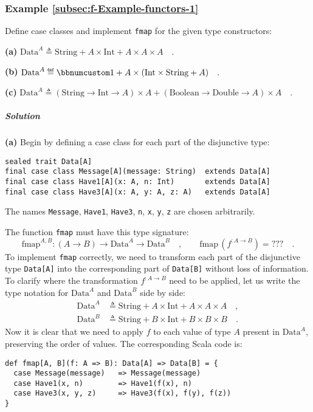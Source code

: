 \subsubsection{Example \label{subsec:f-Example-functors-1}\ref{subsec:f-Example-functors-1}}

Define case classes and implement \lstinline!fmap! for the given
type constructors:

\textbf{(a)} $\text{Data}^{A}\triangleq\text{String}+A\times\text{Int}+A\times A\times A\quad.$

\textbf{(b)} $\text{Data}^{A}\triangleq\bbnum 1+A\times(\text{Int}\times\text{String}+A)\quad.$

\textbf{(c)} $\text{Data}^{A}\triangleq(\text{String}\rightarrow\text{Int}\rightarrow A)\times A+(\text{Boolean}\rightarrow\text{Double}\rightarrow A)\times A\quad.$

\subparagraph{Solution}

\textbf{(a)} Begin by defining a case class for each part of the disjunctive
type:
\begin{lstlisting}
sealed trait Data[A] 
final case class Message[A](message: String)  extends Data[A]
final case class Have1[A](x: A, n: Int)       extends Data[A]  
final case class Have3[A](x: A, y: A, z: A)   extends Data[A]
\end{lstlisting}
The names \lstinline!Message!, \lstinline!Have1!, \lstinline!Have3!,
\lstinline!n!, \lstinline!x!, \lstinline!y!, \lstinline!z! are
chosen arbitrarily. 

The function \lstinline!fmap! must have this type signature:
\[
\text{fmap}^{A,B}:\left(A\rightarrow B\right)\rightarrow\text{Data}^{A}\rightarrow\text{Data}^{B}\quad,\quad\quad\text{fmap}\,(f^{:A\rightarrow B})=\text{???}\quad.
\]
To implement \lstinline!fmap! correctly, we need to transform each
part of the disjunctive type \lstinline!Data[A]! into the corresponding
part of \lstinline!Data[B]! without loss of information. To clarify
where the transformation $f^{:A\rightarrow B}$ need to be applied,
let us write the type notation for $\text{Data}^{A}$ and $\text{Data}^{B}$
side by side:
\begin{align*}
\text{Data}^{A} & \triangleq\text{String}+A\times\text{Int}+A\times A\times A\quad,\\
\text{Data}^{B} & \triangleq\text{String}+B\times\text{Int}+B\times B\times B\quad.
\end{align*}
Now it is clear that we need to apply $f$ to each value of type $A$
present in $\text{Data}^{A}$, preserving the order of values. The
corresponding Scala code is:
\begin{lstlisting}
def fmap[A, B](f: A => B): Data[A] => Data[B] = {
  case Message(message)   => Message(message)
  case Have1(x, n)        => Have1(f(x), n)
  case Have3(x, y, z)     => Have3(f(x), f(y), f(z))
}
\end{lstlisting}

